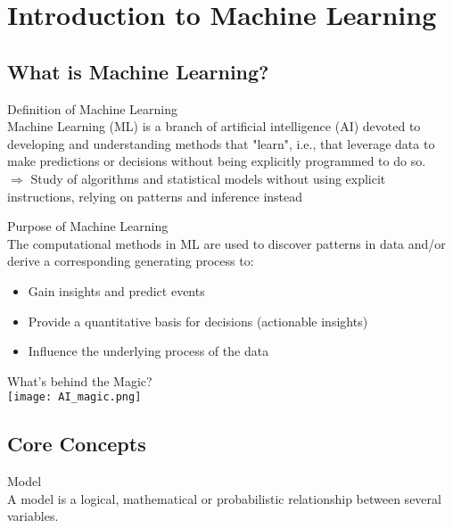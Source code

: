 \section{Introduction to Machine Learning}


\subsection{What is Machine Learning?}

\begin{definition}{Definition of Machine Learning}\\
    Machine Learning (ML) is a branch of artificial intelligence (AI) devoted to developing and understanding methods that "learn", i.e., that leverage data to make predictions or decisions without being explicitly programmed to do so.\\
    $\Rightarrow$ Study of algorithms and statistical models without using explicit instructions, relying on patterns and inference instead
\end{definition}

\begin{concept}{Purpose of Machine Learning}\\
The computational methods in ML are used to discover patterns in data and/or derive a corresponding generating process to:
\begin{itemize}
    \item Gain insights and predict events
    \item Provide a quantitative basis for decisions (actionable insights)
    \item Influence the underlying process of the data
\end{itemize}
\end{concept}

\begin{definition}{What's behind the Magic?} \\
    \texttt{[image: AI\_magic.png]}
\end{definition}

\subsection{Core Concepts}

\begin{definition}{Model}\\
A model is a logical, mathematical or probabilistic relationship between several variables.
\end{definition}

